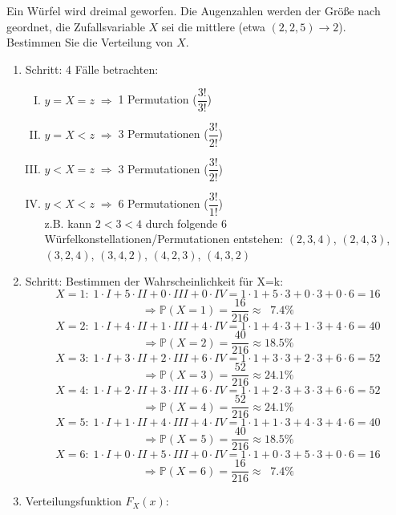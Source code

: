 \begin{uebsp}
\begin{Exercise}[label=ex:1.7]
Ein Würfel wird dreimal geworfen. Die Augenzahlen werden der Größe nach geordnet, die Zufallsvariable $X$ sei die mittlere (etwa $(2, 2, 5) \rightarrow 2$).\\
Bestimmen Sie die Verteilung von $X$.
\end{Exercise}
\begin{Answer}
    \begin{enumerate}[1.]
        \item Schritt: 4 Fälle betrachten:
                \begin{enumerate}[I)]
                    \item $y=X=z\;\Rightarrow\;$1 Permutation ($\dfrac{3!}{3!}$)
                    \item $y=X<z\;\Rightarrow\;$3 Permutationen ($\dfrac{3!}{2!}$)
                    \item $y<X=z\;\Rightarrow\;$3 Permutationen ($\dfrac{3!}{2!}$)
                    \item $y<X<z\;\Rightarrow\;$6 Permutationen ($\dfrac{3!}{1!}$)\\
                        z.B. kann $2<3<4$ durch folgende 6 Würfelkonstellationen/Permutationen entstehen:
                        $(2,3,4)$, $(2,4,3)$, $(3,2,4)$, $(3,4,2)$, $(4,2,3)$, $(4,3,2)$
                \end{enumerate}
        \item Schritt: Bestimmen der Wahrscheinlichkeit für X=k:
            \[X=1:\;1\cdot I+5\cdot II+0\cdot III+0\cdot IV=1\cdot1+5\cdot3+0\cdot3+0\cdot6=16\]
                \[\Rightarrow\mathbb{P}(X=1)=\frac{16}{216}\approx \;\;7.4\%\]
            \[X=2:\;1\cdot I+4\cdot II+1\cdot III+4\cdot IV=1\cdot1+4\cdot3+1\cdot3+4\cdot6=40\]
                \[\Rightarrow\mathbb{P}(X=2)=\frac{40}{216}\approx 18.5\%\]
            \[X=3:\;1\cdot I+3\cdot II+2\cdot III+6\cdot IV=1\cdot1+3\cdot3+2\cdot3+6\cdot6=52\]
                \[\Rightarrow\mathbb{P}(X=3)=\frac{52}{216}\approx 24.1\%\]
            \[X=4:\;1\cdot I+2\cdot II+3\cdot III+6\cdot IV=1\cdot1+2\cdot3+3\cdot3+6\cdot6=52\]
                \[\Rightarrow\mathbb{P}(X=4)=\frac{52}{216}\approx 24.1\%\]
            \[X=5:\;1\cdot I+1\cdot II+4\cdot III+4\cdot IV=1\cdot1+1\cdot3+4\cdot3+4\cdot6=40\]
                \[\Rightarrow\mathbb{P}(X=5)=\frac{40}{216}\approx 18.5\%\]
            \[X=6:\;1\cdot I+0\cdot II+5\cdot III+0\cdot IV=1\cdot1+0\cdot3+5\cdot3+0\cdot6=16\]
                \[\Rightarrow\mathbb{P}(X=6)=\frac{16}{216}\approx \;\;7.4\%\]
        \item Verteilungsfunktion $F_X(x)$:
            \begin{multicols}{2}


\end{multicols}
\end{enumerate}
\end{Answer}
\end{uebsp}
